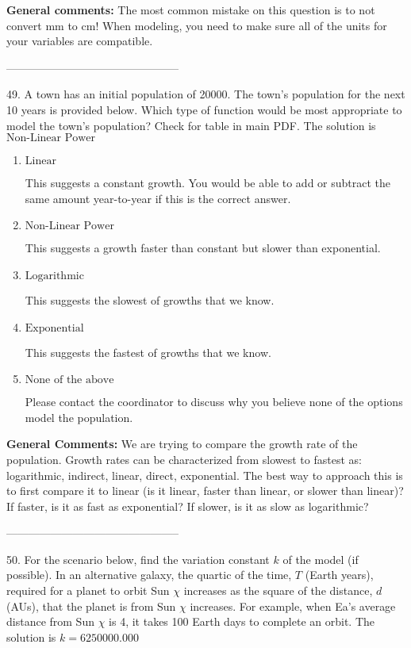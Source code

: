 \documentclass{extbook}[14pt]
\begin{document}
\textbf{General comments:} The most common mistake on this question is to not convert mm to cm! When modeling, you need to make sure all of the units for your variables are compatible.

-----------------------------------------------

49. A town has an initial population of 20000. The town's population for the next 10 years is provided below. Which type of function would be most appropriate to model the town's population?
Check for table in main PDF. 
The solution is $ \text{Non-Linear Power} $ 

\begin{enumerate}[label=\Alph*.] 
\item $ \text{Linear} $ 

 This suggests a constant growth. You would be able to add or subtract the same amount year-to-year if this is the correct answer. 
\item $ \text{Non-Linear Power} $ 

 This suggests a growth faster than constant but slower than exponential. 
\item $ \text{Logarithmic} $ 

 This suggests the slowest of growths that we know. 
\item $ \text{Exponential} $ 

 This suggests the fastest of growths that we know. 
\item $ \text{None of the above} $ 

 Please contact the coordinator to discuss why you believe none of the options model the population. 
\end{enumerate} 
 
\textbf{General Comments:} We are trying to compare the growth rate of the population. Growth rates can be characterized from slowest to fastest as: logarithmic, indirect, linear, direct, exponential. The best way to approach this is to first compare it to linear (is it linear, faster than linear, or slower than linear)? If faster, is it as fast as exponential? If slower, is it as slow as logarithmic?

-----------------------------------------------

50. For the scenario below, find the variation constant $k$ of the model (if possible).
In an alternative galaxy, the quartic of the time, $T$ (Earth years), required for a planet to orbit Sun $\chi$ increases as the square of the distance, $d$ (AUs), that the planet is from Sun $\chi$ increases. For example, when Ea's average distance from Sun $\chi$ is 4, it takes 100 Earth days to complete an orbit. 
The solution is $ k = 6250000.000 $ 
\end{document}
